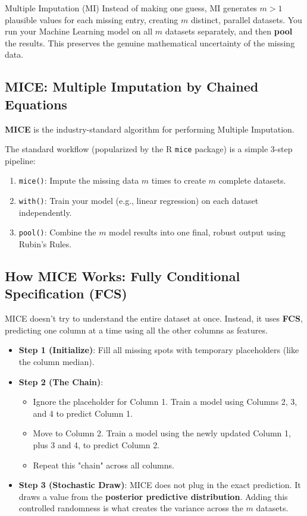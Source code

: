 \documentclass[11pt]{article}
\theoremstyle{smallexample}
\begin{document}
\begin{defbox}{Multiple Imputation (MI)}
    Instead of making one guess, MI generates \textbf{$m > 1$} plausible values for each missing entry, creating $m$ distinct, parallel datasets. You run your Machine Learning model on all $m$ datasets separately, and then \textbf{pool} the results. This preserves the genuine mathematical uncertainty of the missing data.
\end{defbox}

\subsection{MICE: Multiple Imputation by Chained Equations}

\textbf{MICE} is the industry-standard algorithm for performing Multiple Imputation. 


The standard workflow (popularized by the R \texttt{mice} package) is a simple 3-step pipeline:
\begin{enumerate}
    \item \texttt{mice()}: Impute the missing data $m$ times to create $m$ complete datasets.
    \item \texttt{with()}: Train your model (e.g., linear regression) on each dataset independently.
    \item \texttt{pool()}: Combine the $m$ model results into one final, robust output using Rubin's Rules.
\end{enumerate}

\subsection{How MICE Works: Fully Conditional Specification (FCS)}

MICE doesn't try to understand the entire dataset at once. Instead, it uses \textbf{FCS}, predicting one column at a time using all the other columns as features.

\begin{itemize}
    \item \textbf{Step 1 (Initialize)}: Fill all missing spots with temporary placeholders (like the column median).
    \item \textbf{Step 2 (The Chain)}: 
    \begin{itemize}
        \item Ignore the placeholder for Column 1. Train a model using Columns 2, 3, and 4 to predict Column 1.
        \item Move to Column 2. Train a model using the newly updated Column 1, plus 3 and 4, to predict Column 2.
        \item Repeat this "chain" across all columns.
    \end{itemize}
    \item \textbf{Step 3 (Stochastic Draw)}: MICE does not plug in the exact prediction. It draws a value from the \textbf{posterior predictive distribution}. Adding this controlled randomness is what creates the variance across the $m$ datasets.
\end{itemize}
\end{document}
